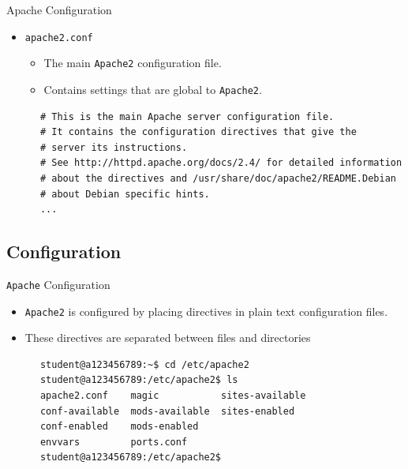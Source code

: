 \documentclass[xcolor=table,aspectratio=169]{beamer}
\begin{document}
\begin{frame}[fragile]{Apache Configuration}
  \begin{itemize}
    \item \texttt{apache2.conf}
      \begin{itemize}
        \item The main \texttt{Apache2} configuration file. 
        \item Contains settings that are global to \texttt{Apache2}.
      \end{itemize}
  \end{itemize}
  \begin{tcolorbox}
    \lstset{
      basicstyle=\tiny\ttfamily,
    }
    \begin{lstlisting}
      # This is the main Apache server configuration file.  
      # It contains the configuration directives that give the 
      # server its instructions.
      # See http://httpd.apache.org/docs/2.4/ for detailed information 
      # about the directives and /usr/share/doc/apache2/README.Debian 
      # about Debian specific hints.
      ...
    \end{lstlisting}
  \end{tcolorbox}
\end{frame}

\subsection{Configuration}
\begin{frame}[fragile]{\texttt{Apache} Configuration}
  \begin{itemize}
    \item \texttt{Apache2} is configured by placing directives in plain text configuration files. 
    \item These directives are separated between files and directories
  \end{itemize}
  \begin{tcolorbox}
    \lstset{
      basicstyle=\tiny\ttfamily,
    }
    \begin{lstlisting}
      student@a123456789:~$ cd /etc/apache2
      student@a123456789:/etc/apache2$ ls
      apache2.conf    magic           sites-available
      conf-available  mods-available  sites-enabled
      conf-enabled    mods-enabled
      envvars         ports.conf
      student@a123456789:/etc/apache2$
    \end{lstlisting}
  \end{tcolorbox}
\end{frame}
\end{document}
